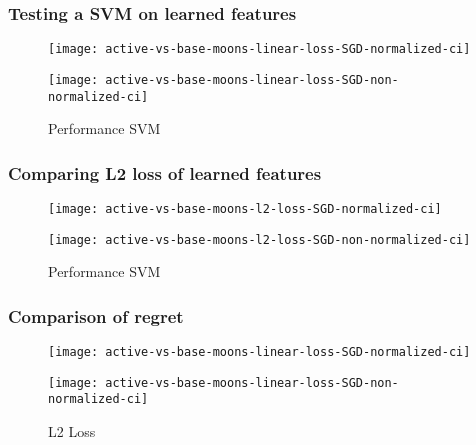 \documentclass{beamer}
\begin{document}
\begin{frame}
    \frametitle{Testing a SVM on learned features}
\begin{figure}[!h]
    \centering
    \begin{minipage}{.5\textwidth}
      \centering
      \texttt{[image: active-vs-base-moons-linear-loss-SGD-normalized-ci]}
    \end{minipage}%
    \begin{minipage}{.5\textwidth}
      \centering
      \texttt{[image: active-vs-base-moons-linear-loss-SGD-non-normalized-ci]}
    \end{minipage}
    \caption{Performance SVM}
  \end{figure}
\end{frame}

\begin{frame}{}
    \frametitle{Comparing L2 loss of learned features}
\begin{figure}[!h]
    \centering
    \begin{minipage}{.5\textwidth}
      \centering
      \texttt{[image: active-vs-base-moons-l2-loss-SGD-normalized-ci]}
    \end{minipage}%
    \begin{minipage}{.5\textwidth}
      \centering
      \texttt{[image: active-vs-base-moons-l2-loss-SGD-non-normalized-ci]}
    \end{minipage}
    \caption{Performance SVM}
  \end{figure}
\end{frame}



\begin{frame}{}
    \frametitle{Comparison of regret}

\begin{figure}[!h]
    \centering
    \begin{minipage}{.5\textwidth}
      \centering
      \texttt{[image: active-vs-base-moons-linear-loss-SGD-normalized-ci]}
    \end{minipage}%
    \begin{minipage}{.5\textwidth}
      \centering
      \texttt{[image: active-vs-base-moons-linear-loss-SGD-non-normalized-ci]}
    \end{minipage}
    \caption{L2 Loss}
  \end{figure}
\end{frame}
\end{document}
